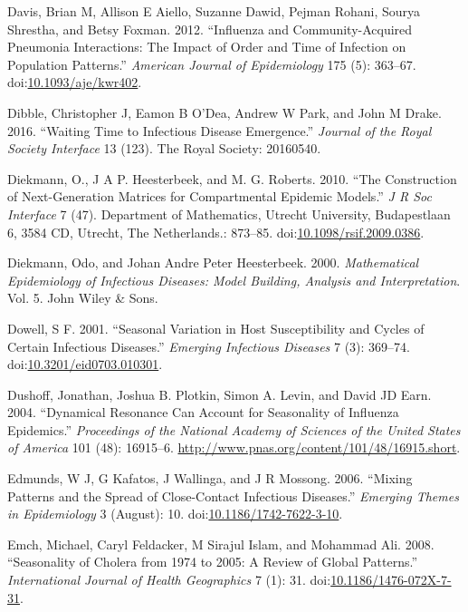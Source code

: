 \documentclass[]{book}
\theoremstyle{definition}
\theoremstyle{definition}
\theoremstyle{definition}
\theoremstyle{remark}
\begin{document}
\hypertarget{ref-davis12}{}
Davis, Brian M, Allison E Aiello, Suzanne Dawid, Pejman Rohani, Sourya
Shrestha, and Betsy Foxman. 2012. ``Influenza and Community-Acquired
Pneumonia Interactions: The Impact of Order and Time of Infection on
Population Patterns.'' \emph{American Journal of Epidemiology} 175 (5):
363--67.
doi:\href{https://doi.org/10.1093/aje/kwr402}{10.1093/aje/kwr402}.

\hypertarget{ref-dibble16}{}
Dibble, Christopher J, Eamon B O'Dea, Andrew W Park, and John M Drake.
2016. ``Waiting Time to Infectious Disease Emergence.'' \emph{Journal of
the Royal Society Interface} 13 (123). The Royal Society: 20160540.

\hypertarget{ref-diekmann10}{}
Diekmann, O., J A P. Heesterbeek, and M. G. Roberts. 2010. ``The
Construction of Next-Generation Matrices for Compartmental Epidemic
Models.'' \emph{J R Soc Interface} 7 (47). Department of Mathematics,
Utrecht University, Budapestlaan 6, 3584 CD, Utrecht, The Netherlands.:
873--85.
doi:\href{https://doi.org/10.1098/rsif.2009.0386}{10.1098/rsif.2009.0386}.

\hypertarget{ref-diekmann00}{}
Diekmann, Odo, and Johan Andre Peter Heesterbeek. 2000.
\emph{Mathematical Epidemiology of Infectious Diseases: Model Building,
Analysis and Interpretation}. Vol. 5. John Wiley \& Sons.

\hypertarget{ref-dowell01}{}
Dowell, S F. 2001. ``Seasonal Variation in Host Susceptibility and
Cycles of Certain Infectious Diseases.'' \emph{Emerging Infectious
Diseases} 7 (3): 369--74.
doi:\href{https://doi.org/10.3201/eid0703.010301}{10.3201/eid0703.010301}.

\hypertarget{ref-dushoff04}{}
Dushoff, Jonathan, Joshua B. Plotkin, Simon A. Levin, and David JD Earn.
2004. ``Dynamical Resonance Can Account for Seasonality of Influenza
Epidemics.'' \emph{Proceedings of the National Academy of Sciences of
the United States of America} 101 (48): 16915--6.
\url{http://www.pnas.org/content/101/48/16915.short}.

\hypertarget{ref-edmunds06}{}
Edmunds, W J, G Kafatos, J Wallinga, and J R Mossong. 2006. ``Mixing
Patterns and the Spread of Close-Contact Infectious Diseases.''
\emph{Emerging Themes in Epidemiology} 3 (August): 10.
doi:\href{https://doi.org/10.1186/1742-7622-3-10}{10.1186/1742-7622-3-10}.

\hypertarget{ref-emch08}{}
Emch, Michael, Caryl Feldacker, M Sirajul Islam, and Mohammad Ali. 2008.
``Seasonality of Cholera from 1974 to 2005: A Review of Global
Patterns.'' \emph{International Journal of Health Geographics} 7 (1):
31.
doi:\href{https://doi.org/10.1186/1476-072X-7-31}{10.1186/1476-072X-7-31}.
\end{document}
